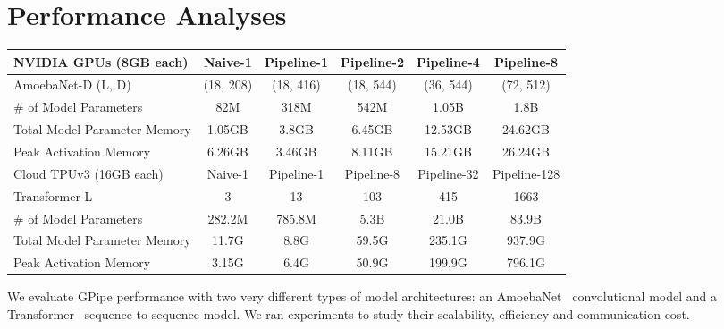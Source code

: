 \documentclass{article}
\def\codename{GPipe}
\begin{document}
\section{Performance Analyses}
\begin{table*}[t]
\begin{small}
\begin{center}
\caption{Maximum model size of AmoebaNet supported by \codename{} under different scenarios. Naive-1 refers to the sequential version without \codename{}. Pipeline- means  partitions with \codename{} on  accelerators. AmoebaNet-D (L, D): AmoebaNet model with  normal cell layers and filter size  .  Transformer-L: Transformer model with  layers, 2048 model and 8192 hidden dimensions. Each model parameter needs  bytes since we applied RMSProp during training.}
\label{results_memory_tab}
\begin{tabular}{lccccc}
\toprule
 NVIDIA GPUs (8GB each) & Naive-1  & Pipeline-1 & Pipeline-2 & Pipeline-4 & Pipeline-8  \\
\midrule
AmoebaNet-D (L, D) &  (18, 208) & (18, 416) &  (18, 544) & (36, 544) & (72, 512) \\
\# of Model Parameters & 82M & 318M & 542M & 1.05B & 1.8B \\
Total Model Parameter Memory & 1.05GB & 3.8GB & 6.45GB & 12.53GB & 24.62GB \\ 
Peak Activation Memory & 6.26GB & 3.46GB & 8.11GB & 15.21GB & 26.24GB\\ 
\midrule
 Cloud TPUv3 (16GB each) & Naive-1  & Pipeline-1  & Pipeline-8 & Pipeline-32 & Pipeline-128  \\
\midrule
Transformer-L & 3   & 13 & 103 & 415 & 1663 \\
\# of Model Parameters & 282.2M & 785.8M & 5.3B  & 21.0B & 83.9B \\
Total Model Parameter Memory & 11.7G & 8.8G  &  59.5G & 235.1G & 937.9G \\ 
Peak Activation Memory & 3.15G & 6.4G  &  50.9G & 199.9G & 796.1G \\ 
\bottomrule
\end{tabular}
\end{center}
\end{small}
\end{table*}


We evaluate \codename{} performance with two very different types of model architectures: an AmoebaNet~\cite{real2018regularized} convolutional model and a Transformer~\cite{vaswani2017attention}  sequence-to-sequence model. We ran experiments to study their scalability, efficiency and communication cost.
\end{document}
